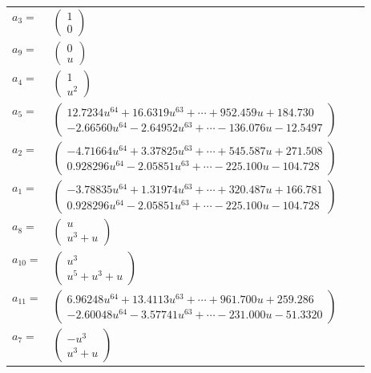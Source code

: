 \documentclass[1p]{elsarticle_modified}
\theoremstyle{definition}
\begin{document}
\begin{tabular}{m{7pt} m{180pt} m{7pt} m{180pt} }
\flushright $a_{3}=$&$\begin{pmatrix}1\\0\end{pmatrix}$ \\
\flushright $a_{9}=$&$\begin{pmatrix}0\\u\end{pmatrix}$ \\
\flushright $a_{4}=$&$\begin{pmatrix}1\\u^2\end{pmatrix}$ \\
\flushright $a_{5}=$&$\begin{pmatrix}12.7234 u^{64}+16.6319 u^{63}+\cdots+952.459 u+184.730\\-2.66560 u^{64}-2.64952 u^{63}+\cdots-136.076 u-12.5497\end{pmatrix}$ \\
\flushright $a_{2}=$&$\begin{pmatrix}-4.71664 u^{64}+3.37825 u^{63}+\cdots+545.587 u+271.508\\0.928296 u^{64}-2.05851 u^{63}+\cdots-225.100 u-104.728\end{pmatrix}$ \\
\flushright $a_{1}=$&$\begin{pmatrix}-3.78835 u^{64}+1.31974 u^{63}+\cdots+320.487 u+166.781\\0.928296 u^{64}-2.05851 u^{63}+\cdots-225.100 u-104.728\end{pmatrix}$ \\
\flushright $a_{8}=$&$\begin{pmatrix}u\\u^3+u\end{pmatrix}$ \\
\flushright $a_{10}=$&$\begin{pmatrix}u^3\\u^5+u^3+u\end{pmatrix}$ \\
\flushright $a_{11}=$&$\begin{pmatrix}6.96248 u^{64}+13.4113 u^{63}+\cdots+961.700 u+259.286\\-2.60048 u^{64}-3.57741 u^{63}+\cdots-231.000 u-51.3320\end{pmatrix}$ \\
\flushright $a_{7}=$&$\begin{pmatrix}- u^3\\u^3+u\end{pmatrix}$ \\

\end{tabular}
\end{document}
